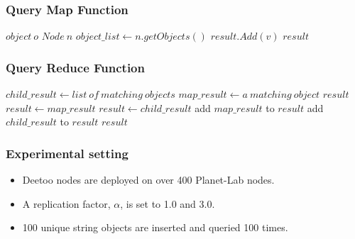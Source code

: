 \documentclass[red]{beamer}
\begin{document}
\begin{frame}
\frametitle{Query Map Function}
\begin{algorithmic}[1]
\REQUIRE $object~ o$     
\REQUIRE $Node~ n$
\STATE $object\_list \leftarrow n.getObjects()$ %
    \STATE $result.Add(v)$
  \ENDIF
\ENDFOR
\RETURN $result$
\end{algorithmic}
\end{frame}

%

\begin{frame}
\frametitle{Query Reduce Function}
\begin{algorithmic}[1]
\STATE $child\_result \leftarrow list\ of\ matching\ objects$ 
\STATE $map\_result \leftarrow a\ matching\ object$ 
\STATE $result$
  \STATE $result \leftarrow map\_result$
  \STATE $result \leftarrow child\_result$
\ELSE
  \STATE add $map\_result$ to $result$
  \STATE add $child\_result$ to $result$
\ENDIF
\RETURN $result$
\end{algorithmic}
\end{frame}

\begin{frame}
\frametitle{Experimental setting}
\begin{itemize}
\item Deetoo nodes are deployed on over 400 Planet-Lab nodes. 
\item A replication factor, $\alpha$, is set to 1.0 and 3.0.
\item 100 unique string objects are inserted and queried 100 times.
\end{itemize}
\end{frame}
\end{document}
